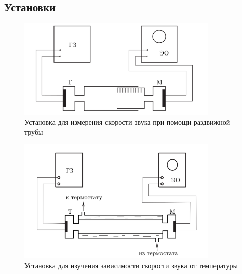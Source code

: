 \documentclass[11pt,a4paper]{article}
\begin{document}
  \newpage
  \begin{center}
    
    \section*{Установки}
    \begin{figure}[h]
      \includegraphics[width=0.85\textwidth]{movingtube.png}
      \caption{Установка для измерения скорости звука
      при помощи раздвижной трубы}
    \end{figure}
    \begin{figure}[h]
      \includegraphics[width=0.85\textwidth]{c ot t.png}
      \caption{Установка для изучения зависимости скорости звука
      от температуры}
    \end{figure}
  \end{center}
\end{document}
